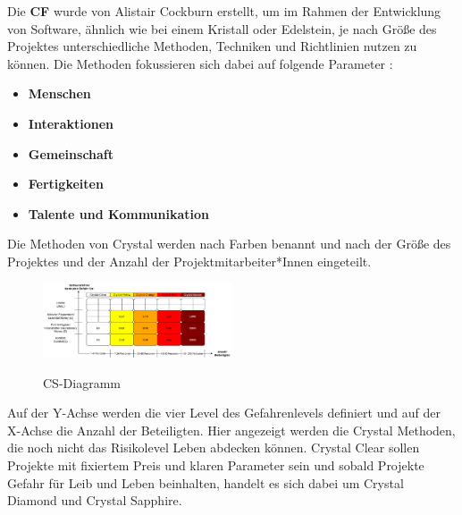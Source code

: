 Die \textbf{CF} wurde von Alistair Cockburn erstellt, um im Rahmen der Entwicklung von Software, ähnlich wie bei einem Kristall oder Edelstein, 
je nach Größe des Projektes unterschiedliche Methoden, Techniken und Richtlinien nutzen zu können. Die Methoden fokussieren sich 
dabei auf folgende Parameter \cite{Ibrahim2020-ip}:
\begin{itemize}
    \item \textbf{Menschen}
    \item \textbf{Interaktionen} 
    \item \textbf{Gemeinschaft}    
    \item \textbf{Fertigkeiten}
    \item \textbf{Talente und Kommunikation }
\end{itemize}
Die Methoden von Crystal werden nach Farben benannt und nach der Größe des Projektes und der Anzahl der Projektmitarbeiter*Innen eingeteilt.
\begin{figure}[h!]
    \centering
    \caption{CS-Diagramm}
        \includegraphics[width=0.5\textwidth]{fig/CSD.png}
        \label{fig:CS-diagram}
    \end{figure}
Auf der Y-Achse werden die vier Level des Gefahrenlevels definiert und auf der X-Achse die Anzahl der Beteiligten. 
Hier angezeigt werden die Crystal Methoden, die noch nicht das Risikolevel Leben abdecken können. 
Crystal Clear sollen Projekte mit fixiertem Preis und klaren Parameter sein und sobald Projekte Gefahr für Leib 
und Leben beinhalten, handelt es sich dabei um Crystal Diamond und Crystal Sapphire.\cite{cockburn2004,Ibrahim2020-ip} \\

